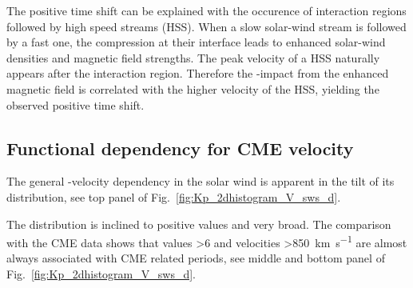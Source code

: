 The positive time shift can be explained with the occurence of interaction regions followed by high speed streams (HSS). When a slow solar-wind stream is followed by a fast one, the compression at their interface leads to enhanced solar-wind densities and magnetic field strengths. The peak velocity of a HSS naturally appears after the interaction region. Therefore the \Kp-impact from the enhanced magnetic field is correlated with the higher velocity of the HSS, yielding the observed positive time shift.


\subsection{Functional dependency for CME velocity}
The general \Kp-velocity dependency in the solar wind is apparent in the tilt of its distribution, see top panel of Fig.~\ref{fig:Kp_2dhistogram_V_sws_d}.
\begin{figure}
\end{figure}
The distribution is inclined to positive values and very broad. The comparison with the CME data shows that \Kp{} values \num{>6} and velocities \SI{>850}{\km\per\s} are almost always associated with CME related periods, see middle and bottom panel of Fig.~\ref{fig:Kp_2dhistogram_V_sws_d}.

